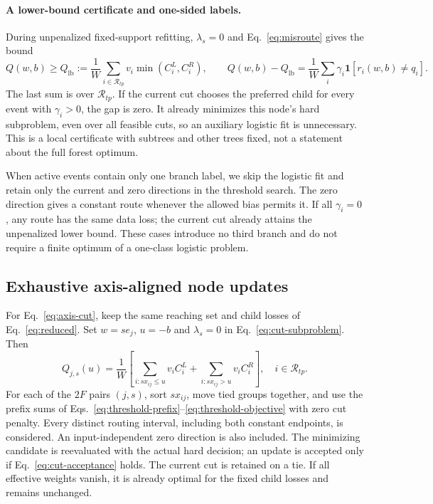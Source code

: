 \documentclass[11pt,a4paper]{article}
\newcommand{\ind}{\mathbf{1}}
\begin{document}
\paragraph{A lower-bound certificate and one-sided labels.}
During unpenalized fixed-support refitting, $\lambda_s=0$ and
Eq.~\eqref{eq:misroute} gives the bound
\begin{equation}
 Q(w,b)\geq Q_{\mathrm{lb}}
 :=\frac1W\sum_{i\in\mathcal R_{tp}}v_i\min(C_i^L,C_i^R),\qquad
 Q(w,b)-Q_{\mathrm{lb}}
 =\frac1W\sum_i\gamma_i\ind[r_i(w,b)\ne q_i].
 \label{eq:cut-lower-bound}
\end{equation}
The last sum is over $\mathcal R_{tp}$. If the current cut chooses the
preferred child for every event with $\gamma_i>0$, the gap is zero. It already
minimizes this node's hard subproblem, even over all feasible cuts, so an
auxiliary logistic fit is unnecessary. This is a local certificate with
subtrees and other trees fixed, not a statement about the full forest optimum.

When active events contain only one branch label, we skip the logistic fit
and retain only the current and zero directions in the threshold search.
The zero direction gives a constant route whenever the allowed bias permits
it. If all $\gamma_i=0$, any route has the same data loss; the current cut
already attains the unpenalized lower bound. These cases introduce no third
branch and do not require a finite optimum of a one-class logistic problem.

\subsection{Exhaustive axis-aligned node updates}
For Eq.~\eqref{eq:axis-cut}, keep the same reaching set and child losses of
Eq.~\eqref{eq:reduced}. Set $w=se_j$, $u=-b$ and $\lambda_s=0$ in
Eq.~\eqref{eq:cut-subproblem}. Then
\begin{equation}
 Q_{j,s}(u)=\frac1W\left[
 \sum_{i:sx_{ij}\leq u}v_i C_i^L+
 \sum_{i:sx_{ij}>u}v_i C_i^R\right],
 \quad i\in\mathcal R_{tp}.
 \label{eq:axis-objective}
\end{equation}
For each of the $2F$ pairs $(j,s)$, sort $sx_{ij}$, move tied groups together,
and use the prefix sums of Eqs.~\eqref{eq:threshold-prefix}--\eqref{eq:threshold-objective}
with zero cut penalty. Every distinct routing interval, including both constant
endpoints, is considered. An input-independent zero direction is also included.
The minimizing candidate is reevaluated with the actual hard decision; an
update is accepted only if Eq.~\eqref{eq:cut-acceptance} holds. The current cut
is retained on a tie. If all effective weights vanish, it is already optimal
for the fixed child losses and remains unchanged.
\end{document}
